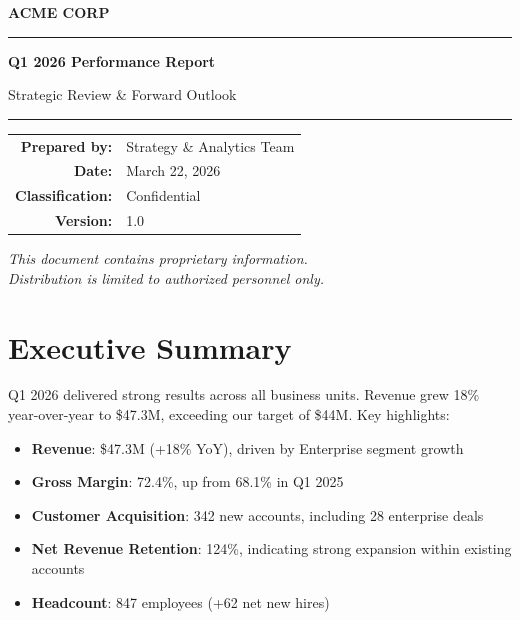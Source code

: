 \documentclass[11pt,a4paper]{article}
\begin{document}
\begin{titlepage}
    \centering
    \vspace*{2cm}

    {\Huge\textbf{\textcolor{accentblue}{ACME CORP}}}

    \vspace{1.5cm}
    \rule{\textwidth}{1pt}
    \vspace{0.5cm}

    {\LARGE\textbf{Q1 2026 Performance Report}}

    \vspace{0.3cm}
    {\large Strategic Review \& Forward Outlook}

    \vspace{0.5cm}
    \rule{\textwidth}{1pt}

    \vspace{2cm}

    \begin{tabular}{rl}
        \textbf{Prepared by:} & Strategy \& Analytics Team \\
        \textbf{Date:} & March 22, 2026 \\
        \textbf{Classification:} & Confidential \\
        \textbf{Version:} & 1.0 \\
    \end{tabular}

    \vfill
    {\small\textit{This document contains proprietary information.\\
    Distribution is limited to authorized personnel only.}}
\end{titlepage}

\newpage
\tableofcontents
\newpage

\section{Executive Summary}
\label{sec:summary}

Q1 2026 delivered strong results across all business units. Revenue grew 18\% year-over-year to \$47.3M, exceeding our target of \$44M. Key highlights:

\begin{itemize}
    \item \textbf{Revenue}: \$47.3M (+18\% YoY), driven by Enterprise segment growth
    \item \textbf{Gross Margin}: 72.4\%, up from 68.1\% in Q1 2025
    \item \textbf{Customer Acquisition}: 342 new accounts, including 28 enterprise deals
    \item \textbf{Net Revenue Retention}: 124\%, indicating strong expansion within existing accounts
    \item \textbf{Headcount}: 847 employees (+62 net new hires)
\end{itemize}
\end{document}

